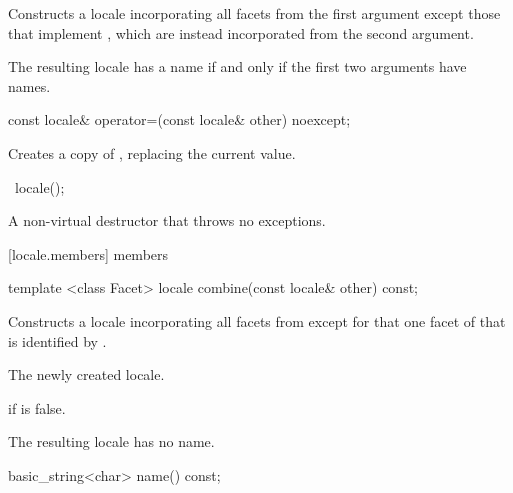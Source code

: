 \begin{itemdescr}
\pnum
\effects
Constructs a locale incorporating all facets from the first argument
except those that implement
,
which are instead incorporated from the second argument.

\pnum
\remarks
The resulting locale has a name if and only if the first two arguments
have names.
\end{itemdescr}

%
%
\begin{itemdecl}
const locale& operator=(const locale& other) noexcept;
\end{itemdecl}

\begin{itemdescr}
\pnum
\effects
Creates a copy of , replacing the current value.

\pnum
\returns
{}
\end{itemdescr}

%
\begin{itemdecl}
~locale();
\end{itemdecl}

\begin{itemdescr}
\pnum
A non-virtual destructor that throws no exceptions.
\end{itemdescr}

[locale.members]{ members}

%
%
\begin{itemdecl}
template <class Facet> locale combine(const locale& other) const;
\end{itemdecl}

\begin{itemdescr}
\pnum
\effects
Constructs a locale incorporating
all facets from
except for that one facet of
that is identified by
.

\pnum
\returns
The newly created locale.

\pnum
\throws
{}
if
is false.

\pnum
\remarks
The resulting locale has no name.
\end{itemdescr}

%
%
\begin{itemdecl}
basic_string<char> name() const;
\end{itemdecl}

